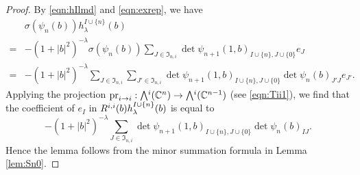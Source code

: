 \begin{proof}
By \eqref{eqn:hIlmd} and \eqref{eqn:exrep}, 
we have
\begin{align*}
&\sigma(\psi_n(b)) h_{\lambda}^{I \cup \{n\}}(b)
\\
=&-(1+|b|^2)^{-\lambda}
  \sigma(\psi_n(b))
  \sum_{J \in {\mathfrak{I}}_{n,i}}
  \det \psi_{n+1}(1,b)_{I \cup \{n\}, J \cup \{0\}}e_J
\\
=&-(1+|b|^2)^{-\lambda}
  \sum_{J \in {\mathfrak{I}}_{n,i}}
  \sum_{J' \in {\mathfrak{I}}_{n,i}}
  \det \psi_{n+1}(1,b)_{I \cup \{n\}, J \cup \{0\}} 
  \det \psi_n(b)_{J' J}e_{J'}.  
\end{align*}
Applying the projection 
 $\pr ii:\Exterior^{i}({\mathbb{C}}^{n}) \to \Exterior^{i}({\mathbb{C}}^{n-1})$
 (see \eqref{eqn:Tii1}), 
 we find that the coefficient of $e_I$
 in $R^{{i},{i}} (b) h_{\lambda}^{I \cup \{n\}}(b)$
 is equal to 
\[
  -(1+|b|^2)^{-\lambda}
  \sum_{J \in {\mathfrak{I}}_{n,i}}
  \det \psi_{n+1}(1,b)_{I \cup \{n\}, J \cup \{0\}}
  \det \psi_n(b)_{I J}.  
\]
Hence the lemma follows from the minor summation formula
 in Lemma \ref{lem:Sn0}.  
\end{proof}



